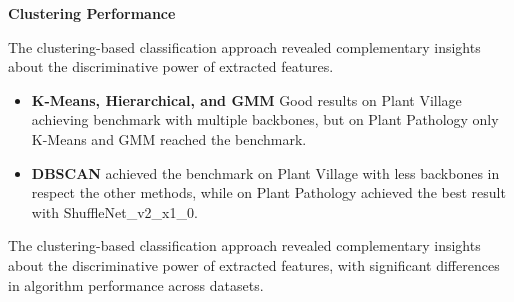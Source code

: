 \documentclass[12pt,a4paper,oneside]{report}
\begin{document}
\textbf{Clustering Performance}

The clustering-based classification approach revealed complementary insights about the discriminative power of extracted features.

\begin{itemize}
    \item \textbf{K-Means, Hierarchical, and GMM} Good results on Plant Village achieving benchmark with multiple backbones, but on Plant Pathology only K-Means and GMM reached the benchmark.
    \item \textbf{DBSCAN} achieved the benchmark on Plant Village with less backbones in respect the other methods, while on Plant Pathology achieved the best result with ShuffleNet\_v2\_x1\_0.
\end{itemize}

The clustering-based classification approach revealed complementary insights about the discriminative power of extracted features, with significant differences in algorithm performance across datasets.
\end{document}
